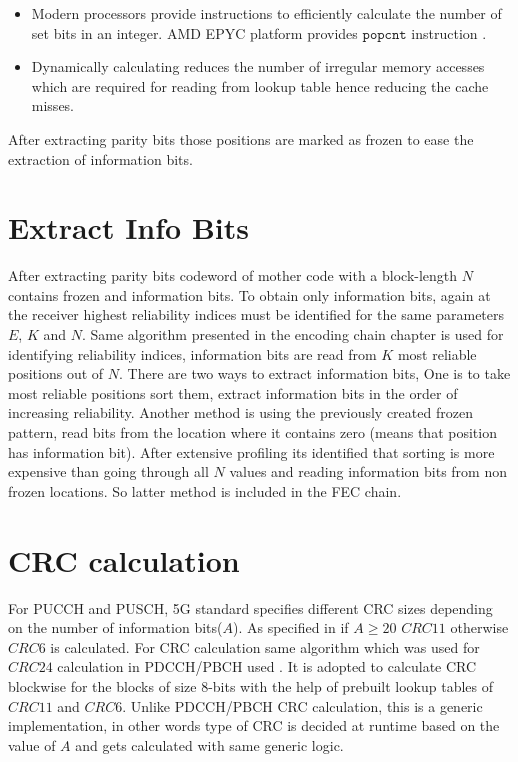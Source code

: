 \begin{itemize}  
	\item Modern processors provide instructions to efficiently calculate the number of set bits in an integer. AMD EPYC platform provides $\mathtt{popcnt}$ instruction \cite{AgnerFog}.
	\item Dynamically calculating reduces the number of irregular memory accesses which are required for reading from lookup table hence reducing the cache misses.
\end{itemize}

After extracting parity bits those positions are marked as frozen to ease the extraction of information bits.

\section{Extract Info Bits}
After extracting parity bits codeword of mother code with a block-length $N$ contains frozen and information bits. To obtain only information bits, again at the receiver highest reliability indices must be identified for the same parameters $E$, $K$ and $N$. Same algorithm presented in the encoding chain chapter is used for identifying reliability indices, information bits are read from $K$ most reliable positions out of $N$. There are two ways to extract information bits, One is to take most reliable positions sort them, extract information bits in the order of increasing reliability. Another method is using the previously created frozen pattern, read bits from the location where it contains zero (means that position has information bit). After extensive profiling its identified that sorting is more expensive than going through all $N$ values and reading information bits from non frozen locations. So latter method is included in the FEC chain.

\section{CRC calculation}
For PUCCH and PUSCH, 5G standard specifies different CRC sizes depending on the number of information bits($A$). As specified in \cite{3gpp.38.212} if $ A \ge 20$ $ CRC11 $  otherwise $ CRC6 $ is calculated.  For CRC calculation same algorithm which was used for $ CRC24 $ calculation in PDCCH/PBCH used \cite{Sarwate:1988:CCR:63030.63037}. It is adopted to calculate CRC blockwise for the blocks of size 8-bits with the help of prebuilt lookup tables of $ CRC11 $ and $ CRC6 $. Unlike PDCCH/PBCH CRC calculation, this is a generic implementation, in other words type of CRC is decided at runtime based on the value of $A$ and gets calculated with same generic logic.

